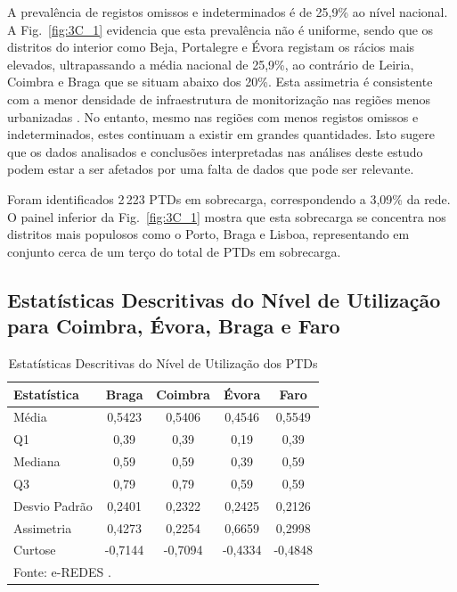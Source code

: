 \documentclass[conference]{IEEEtran}
\begin{document}
A prevalência de registos omissos e indeterminados é de 25,9\% ao nível nacional. A Fig.~\ref{fig:3C_1} evidencia que esta prevalência não é uniforme, sendo que os distritos do interior como Beja, Portalegre e Évora registam os rácios mais elevados, ultrapassando a média nacional de 25,9\%, ao contrário de Leiria, Coimbra e Braga que se situam abaixo dos 20\%. Esta assimetria é consistente com a menor densidade de infraestrutura de monitorização nas regiões menos urbanizadas \cite{b4}. No entanto, mesmo nas regiões com menos registos omissos e indeterminados, estes continuam a existir em grandes quantidades. Isto sugere que os dados analisados e conclusões interpretadas nas análises deste estudo podem estar a ser afetados por uma falta de dados que pode ser relevante.

Foram identificados 2\,223 PTDs em sobrecarga, correspondendo a 3,09\% da rede. O painel inferior da Fig.~\ref{fig:3C_1} mostra que esta sobrecarga se concentra nos distritos mais populosos como o Porto, Braga e Lisboa, representando em conjunto cerca de um terço do total de PTDs em sobrecarga.

\subsection{Estatísticas Descritivas do Nível de Utilização para Coimbra, Évora, Braga e Faro}

\begin{table}[htbp]
\caption{Estatísticas Descritivas do Nível de Utilização dos PTDs}
\begin{center}
\begin{tabular}{lcccc}
\toprule
\textbf{Estatística} & \textbf{Braga} & \textbf{Coimbra} & \textbf{Évora} & \textbf{Faro} \\
\midrule
Média         & 0,5423 & 0,5406 & 0,4546 & 0,5549 \\
Q1            & 0,39   & 0,39   & 0,19   & 0,39   \\
Mediana       & 0,59   & 0,59   & 0,39   & 0,59   \\
Q3            & 0,79   & 0,79   & 0,59   & 0,59   \\
Desvio Padrão & 0,2401 & 0,2322 & 0,2425 & 0,2126 \\
Assimetria    & 0,4273 & 0,2254 & 0,6659 & 0,2998 \\
Curtose       & -0,7144& -0,7094& -0,4334& -0,4848\\
\bottomrule
\multicolumn{5}{l}{\small Fonte: e-REDES \cite{b4}.}
\end{tabular}
\label{tab:descritiva}
\end{center}
\end{table}
\end{document}
